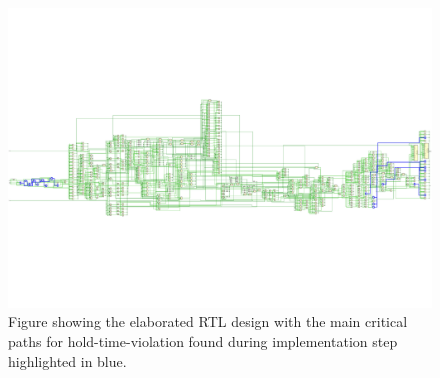 \begin{figure}[H]
    \centering
    \includegraphics[width=\textwidth, trim=0 160 0 160, clip]{./images/Vivado/hold_implementation.pdf}
    \caption{Figure showing the elaborated RTL design with the main critical paths for hold-time-violation found during implementation step highlighted in blue.}
    \label{fig:hold_implementation}
\end{figure}

